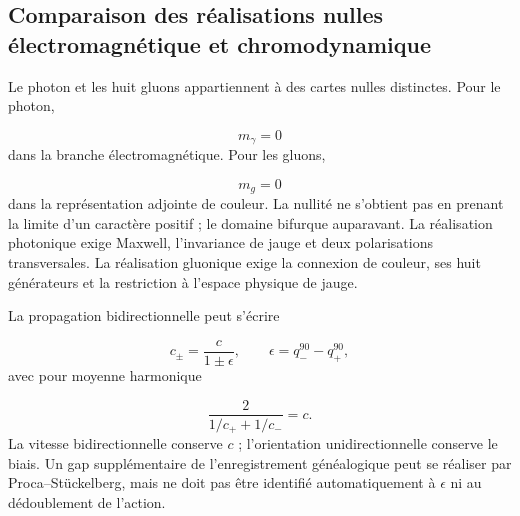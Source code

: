 
\subsection{Comparaison des réalisations nulles électromagnétique et chromodynamique}
Le photon et les huit gluons appartiennent à des cartes nulles distinctes. Pour le photon,

\[
m_\gamma=0
\]
dans la branche électromagnétique. Pour les gluons,

\[
m_g=0
\]
dans la représentation adjointe de couleur. La nullité ne s'obtient pas en prenant la limite d'un caractère positif ; le domaine bifurque auparavant. La réalisation photonique exige Maxwell, l'invariance de jauge et deux polarisations transversales. La réalisation gluonique exige la connexion de couleur, ses huit générateurs et la restriction à l'espace physique de jauge.

La propagation bidirectionnelle peut s'écrire

\[
c_\pm=\frac{c}{1\pm\epsilon},
\qquad
\epsilon=q_-^{90}-q_+^{90},
\]
avec pour moyenne harmonique

\[
\frac{2}{1/c_++1/c_-}=c.
\]
La vitesse bidirectionnelle conserve \(c\) ; l'orientation unidirectionnelle conserve le biais. Un gap supplémentaire de l'enregistrement généalogique peut se réaliser par Proca--Stückelberg, mais ne doit pas être identifié automatiquement à \(\epsilon\) ni au dédoublement de l'action.

